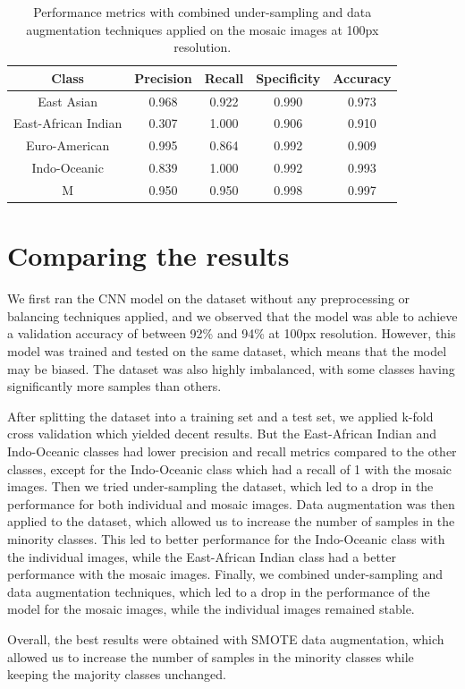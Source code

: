 \begin{table}[H]
	\centering
	\begin{tabular}{|c|c|c|c|c|}
		\hline
		\textbf{Class}      & \textbf{Precision} & \textbf{Recall} & \textbf{Specificity} & \textbf{Accuracy} \\
		\hline
		East Asian          & 0.968              & 0.922           & 0.990                & 0.973             \\
		East-African Indian & 0.307              & 1.000           & 0.906                & 0.910             \\
		Euro-American       & 0.995              & 0.864           & 0.992                & 0.909             \\
		Indo-Oceanic        & 0.839              & 1.000           & 0.992                & 0.993             \\
		M                   & 0.950              & 0.950           & 0.998                & 0.997             \\
		\hline
	\end{tabular}
	\caption{Performance metrics with combined under-sampling and data augmentation techniques applied on the mosaic images at 100px
		resolution.}
	\label{tab:combined_techniques_performance_metrics_mosaic}
\end{table}

\section{Comparing the results}
\label{sec:comparing_results}

We first ran the CNN model on the dataset without any preprocessing or balancing techniques applied, and we observed that the model was
able to achieve a validation accuracy of between 92\% and 94\% at 100px resolution. However, this model was trained and tested on the same
dataset, which means that the model may be biased. The dataset was also highly imbalanced, with some classes having significantly more
samples than others.

After splitting the dataset into a training set and a test set, we applied k-fold cross validation which yielded decent results. But
the East-African Indian and Indo-Oceanic classes had lower precision and recall metrics compared to the other classes, except for the
Indo-Oceanic class which had a recall of 1 with the mosaic images. Then we tried under-sampling the dataset, which led to a drop in
the performance for both individual and mosaic images. Data augmentation was then applied to the dataset, which allowed us to
increase the number of samples in the minority classes. This led to better performance for the Indo-Oceanic class with the individual
images, while the East-African Indian class had a better performance with the mosaic images. Finally, we combined under-sampling
and data augmentation techniques, which led to a drop in the performance of the model for the mosaic images, while the individual images
remained stable.

Overall, the best results were obtained with SMOTE data augmentation, which allowed us to increase the number of samples in the minority
classes while keeping the majority classes unchanged.